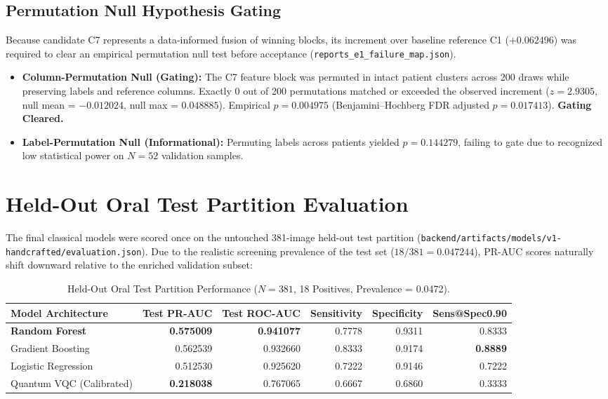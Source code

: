 \documentclass[11pt,a4paper]{report}
\newcommand{\artifact}[1]{\texttt{\footnotesize #1}}
\begin{document}
\subsection{Permutation Null Hypothesis Gating}
Because candidate C7 represents a data-informed fusion of winning blocks, its increment over baseline reference C1 ($+0.062496$) was required to clear an empirical permutation null test before acceptance (\artifact{reports\_e1\_failure\_map.json}).
\begin{itemize}
  \item \textbf{Column-Permutation Null (Gating):} The C7 feature block was permuted in intact patient clusters across 200 draws while preserving labels and reference columns. Exactly 0 out of 200 permutations matched or exceeded the observed increment ($z = 2.9305$, null mean = $-0.012024$, null max = $0.048885$). Empirical \textbf{$p = 0.004975$} (Benjamini--Hochberg FDR adjusted \textbf{$p = 0.017413$}). \textbf{Gating Cleared.}
  \item \textbf{Label-Permutation Null (Informational):} Permuting labels across patients yielded $p = 0.144279$, failing to gate due to recognized low statistical power on $N=52$ validation samples.
\end{itemize}

\section{Held-Out Oral Test Partition Evaluation}
The final classical models were scored once on the untouched 381-image held-out test partition (\artifact{backend/artifacts/models/v1-handcrafted/evaluation.json}). Due to the realistic screening prevalence of the test set ($18 / 381 = 0.047244$), PR-AUC scores naturally shift downward relative to the enriched validation subset:

\begin{table}[H]
\centering
\small
\begin{tabular}{lrrrrr}
\toprule
\textbf{Model Architecture} & \textbf{Test PR-AUC} & \textbf{Test ROC-AUC} & \textbf{Sensitivity} & \textbf{Specificity} & \textbf{Sens@Spec0.90} \\
\midrule
\textbf{Random Forest} & \textbf{0.575009} & \textbf{0.941077} & 0.7778 & 0.9311 & 0.8333 \\
Gradient Boosting & 0.562539 & 0.932660 & 0.8333 & 0.9174 & \textbf{0.8889} \\
Logistic Regression & 0.512530 & 0.925620 & 0.7222 & 0.9146 & 0.7222 \\
Quantum VQC (Calibrated) & \textbf{0.218038} & 0.767065 & 0.6667 & 0.6860 & 0.3333 \\
\bottomrule
\end{tabular}
\caption{Held-Out Oral Test Partition Performance ($N=381$, 18 Positives, Prevalence = 0.0472).}
\label{tab:oral_test_results}
\end{table}
\end{document}
